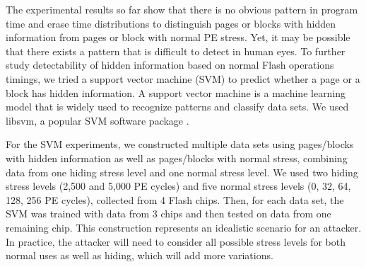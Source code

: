 





The experimental results so far show that there is no obvious pattern in program time 
and erase time distributions to distinguish pages or blocks with hidden information
from pages or block with normal PE stress. 
Yet, it may be possible that there exists a pattern that is difficult to detect
in human eyes. To further study detectability of hidden information based on
normal Flash operations timings, we tried a support vector machine
(SVM) to predict whether a page or a block has hidden information.
A support vector
machine is a machine learning model that is widely used to recognize patterns and
classify data sets. We used libsvm, a popular SVM software package
\cite{libsvm}. 

For the SVM experiments, we constructed multiple data sets using pages/blocks
with hidden information as well as pages/blocks with normal stress, combining
data from one hiding stress level and one normal stress level. We used
two hiding stress levels (2,500 and 5,000 PE cycles) and five normal stress
levels (0, 32, 64, 128, 256 PE cycles), collected from 4 Flash chips.
Then, for each data set, the SVM was trained with data from
3 chips and then tested on data from one remaining chip. 
This construction represents an idealistic scenario for an attacker.
In practice, the attacker will need to consider all possible stress levels for 
both normal uses as well as hiding, which will add more variations.


